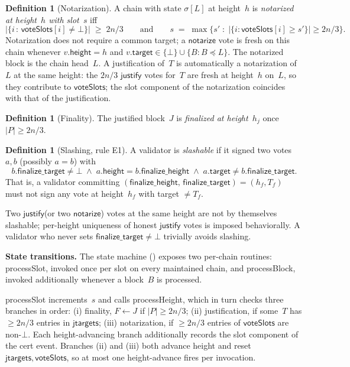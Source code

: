 \documentclass{article}
\newcommand{\target}{\mathsf{target}}
\newcommand{\height}{\mathsf{height}}
\newcommand{\just}{\ensuremath{\mathsf{justify}}\xspace}
\newcommand{\notar}{\ensuremath{\mathsf{notarize}}\xspace}
\newcommand{\finalizeHeight}{\mathsf{finalize\_height}}
\newcommand{\finalizeTarget}{\mathsf{finalize\_target}}
\newcommand{\jtargets}{\mathsf{jtargets}}
\newcommand{\voteSlots}{\mathsf{voteSlots}}
\newcommand{\processSlot}{\textsf{processSlot}\xspace}
\newcommand{\processBlock}{\textsf{processBlock}\xspace}
\newcommand{\processHeight}{\textsf{processHeight}\xspace}
\renewcommand{\paragraph}[1]{\vspace{7pt}\noindent\textbf{#1}}
\theoremstyle{plain}
\theoremstyle{definition}
\newtheorem{definition}[theorem]{Definition}
\theoremstyle{remark}
\begin{document}
\begin{definition}[Notarization]\label{def:notarization}
A chain with state $\sigma[L]$ at height~$h$ is \emph{notarized at height~$h$ with slot~$s$} iff
\[
  \bigl|\{i \,:\, \voteSlots[i] \neq \bot\}\bigr| \;\geq\; 2n/3
  \qquad\text{and}\qquad
  s \;=\; \max\bigl\{s' \;:\; |\{i : \voteSlots[i] \geq s'\}| \geq 2n/3\bigr\}.
\]
Notarization does not require a common target; a \notar vote is fresh on this chain whenever $v.\height = h$ and $v.\target \in \{\bot\} \cup \{B : B \preceq L\}$. The notarized block is the chain head~$L$.
A justification of~$T$ is automatically a notarization of~$L$ at the same height: the $2n/3$ \just votes for~$T$ are fresh at height~$h$ on~$L$, so they contribute to $\voteSlots$; the slot component of the notarization coincides with that of the justification.
\end{definition}

\begin{definition}[Finality]\label{def:finality}
The justified block~$J$ is \emph{finalized at height~$h_j$} once $|P| \geq 2n/3$.
\end{definition}

\begin{definition}[Slashing, rule E1]\label{def:slashing}
A validator is \emph{slashable} if it signed two votes~$a, b$ (possibly $a = b$) with
\[
  b.\finalizeTarget \neq \bot \;\wedge\; a.\height = b.\finalizeHeight \;\wedge\; a.\target \neq b.\finalizeTarget.
\]
That is, a validator committing $(\finalizeHeight,\, \finalizeTarget) = (h_f, T_f)$ must not sign any vote at height~$h_f$ with target $\neq T_f$.
\end{definition}

Two \just (or two \notar) votes at the same height are not by themselves slashable; per-height uniqueness of honest \just votes is imposed behaviorally.
A validator who never sets $\finalizeTarget \neq \bot$ trivially avoids slashing.

\paragraph{State transitions.}
The state machine () exposes two per-chain routines: \processSlot, invoked once per slot on every maintained chain, and \processBlock, invoked additionally whenever a block~$B$ is processed.

\processSlot increments~$s$ and calls \processHeight, which in turn checks three branches in order: (i) finality, $F \gets J$ if $|P| \geq 2n/3$; (ii) justification, if some~$T$ has $\geq 2n/3$ entries in $\jtargets$; (iii) notarization, if $\geq 2n/3$ entries of $\voteSlots$ are non-$\bot$. Each height-advancing branch additionally records the slot component of the cert event.
Branches (ii) and (iii) both advance height and reset $\jtargets, \voteSlots$, so at most one height-advance fires per invocation.
\end{document}
